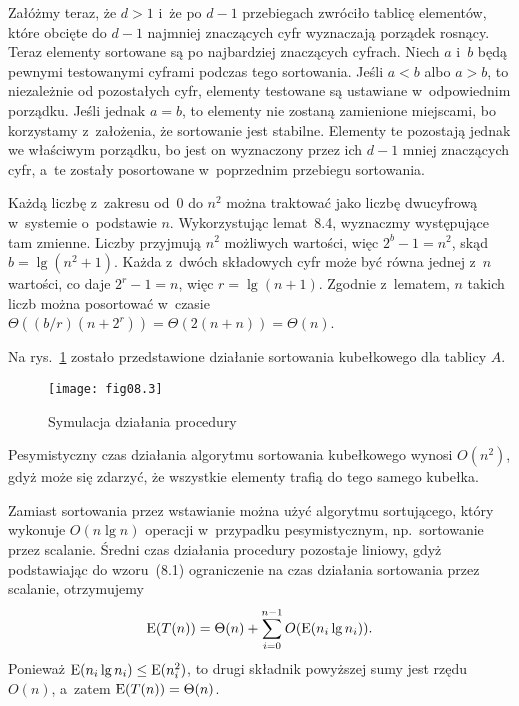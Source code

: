 Załóżmy teraz, że $d>1$ i~że  po $d-1$ przebiegach zwróciło tablicę elementów, które obcięte do $d-1$ najmniej znaczących cyfr wyznaczają porządek rosnący. Teraz elementy sortowane są po  najbardziej znaczących cyfrach. Niech $a$ i~$b$ będą pewnymi testowanymi cyframi podczas tego sortowania. Jeśli $a<b$ albo $a>b$, to niezależnie od pozostałych cyfr, elementy testowane są ustawiane w~odpowiednim porządku. Jeśli jednak $a=b$, to elementy nie zostaną zamienione miejscami, bo korzystamy z~założenia, że sortowanie jest stabilne. Elementy te pozostają jednak we właściwym porządku, bo jest on wyznaczony przez ich $d-1$ mniej znaczących cyfr, a~te zostały posortowane w~poprzednim przebiegu sortowania.

\exercise %
Każdą liczbę z~zakresu od~0 do $n^2$ można traktować jako liczbę dwucyfrową w~systemie o~podstawie $n$. Wykorzystując lemat~8.4, wyznaczmy występujące tam zmienne. Liczby przyjmują $n^2$ możliwych wartości, więc $2^b-1=n^2$, skąd $b=\lg(n^2+1)$. Każda z~dwóch składowych cyfr może być równa jednej z~$n$ wartości, co daje $2^r-1=n$, więc $r=\lg(n+1)$. Zgodnie z~lematem, $n$ takich liczb można posortować w~czasie $\Theta((b/r)(n+2^r))=\Theta(2(n+n))=\Theta(n)$.

\exercise %


\exercise %
Na rys.~\ref{fig:8.4-1} zostało przedstawione działanie sortowania kubełkowego dla tablicy $A$.
\begin{figure}[ht]
	\begin{center}
		\texttt{[image: fig08.3]}
	\end{center}
	\caption{Symulacja działania procedury } \label{fig:8.4-1}
\end{figure}

\exercise %
Pesymistyczny czas działania algorytmu sortowania kubełkowego wynosi $O(n^2)$, gdyż może się zdarzyć, że wszystkie elementy trafią do tego samego kubełka.

Zamiast sortowania przez wstawianie można użyć algorytmu sortującego, który wykonuje $O(n\lg n)$ operacji w~przypadku pesymistycznym, np.\ sortowanie przez scalanie. Średni czas działania procedury  pozostaje liniowy, gdyż podstawiając do wzoru~(8.1) ograniczenie na czas działania sortowania przez scalanie, otrzymujemy
\[
	\operatorname{E}(T(n)) = \Theta(n)+\sum_{i=0}^{n-1}O(\operatorname{E}(n_i\lg n_i)).
\]
Ponieważ $\operatorname{E}(n_i\lg n_i)\le\operatorname{E}(n_i^2)$, to drugi składnik powyższej sumy jest rzędu $O(n)$, a~zatem $\operatorname{E}(T(n))=\Theta(n)$.

